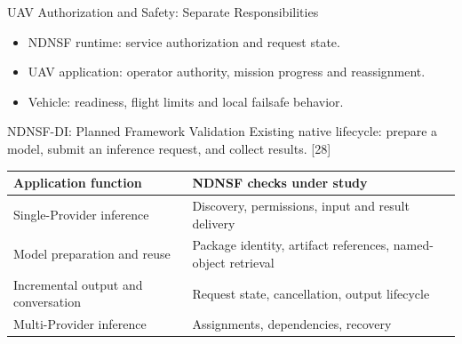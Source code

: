 \begin{frame}{UAV Authorization and Safety: Separate Responsibilities}
\begin{itemize}
\item NDNSF runtime: service authorization and request state.
\item UAV application: operator authority, mission progress and reassignment.
\item Vehicle: readiness, flight limits and local failsafe behavior.
\end{itemize}
\vspace{3mm}
\end{frame}

\begin{frame}{NDNSF-DI: Planned Framework Validation}
\small Existing native lifecycle: prepare a model, submit an inference request, and collect results. [28]
\par\vspace{2mm}
\begin{tabularx}{\linewidth}{p{.38\linewidth}X}
\toprule Application function & NDNSF checks under study\\\midrule
Single-Provider inference & Discovery, permissions, input and result delivery\\\midrule
Model preparation and reuse & Package identity, artifact references, named-object retrieval\\\midrule
Incremental output and conversation & Request state, cancellation, output lifecycle\\\midrule
Multi-Provider inference & Assignments, dependencies, recovery\\\bottomrule
\end{tabularx}
\vspace{3mm}
\end{frame}

